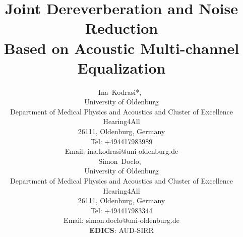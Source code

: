 \documentclass[draftcls,onecolumn,11pt]{IEEEtran}
\begin{document}
\newlength\figureheight
\newlength\figurewidth
\setlength\figureheight{3cm}
\setlength{}

%
\title{Joint Dereverberation and Noise Reduction \\ Based on Acoustic Multi-channel Equalization}

\author{%
Ina~Kodrasi*,~ \\
University of Oldenburg \\[-0.2cm] Department of Medical Physics and Acoustics and Cluster of Excellence Hearing4All \\[-0.2cm] 26111, Oldenburg, Germany\\[-0.2cm] Tel:
+494417983989\\[-0.2cm] Email:
ina.kodrasi@uni-oldenburg.de\\[+0.5cm]
Simon~Doclo,~ \\ University of
Oldenburg \\[-0.2cm] Department of Medical Physics and Acoustics and Cluster of Excellence Hearing4All
\\[-0.2cm] 26111, Oldenburg, Germany\\[-0.2cm] Tel: +494417983344\\[-0.2cm] Email:
simon.doclo@uni-oldenburg.de\\[+0.5cm] {\bf EDICS}: AUD-SIRR}


\maketitle
\newpage
\end{document}
